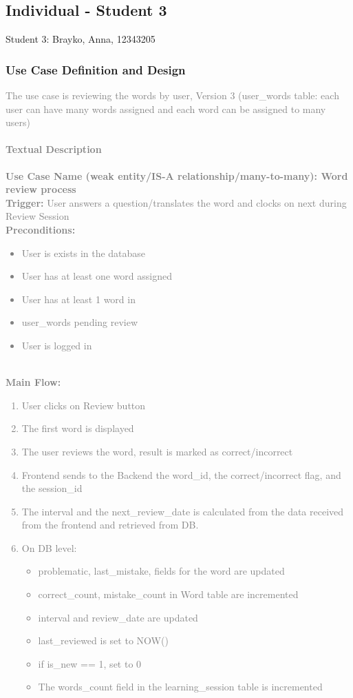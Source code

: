 \documentclass[a4paper, 11pt]{article}
\newcommand{\studentthree}{Student 3: Brayko, Anna, 12343205}
\begin{document}
\newpage

\subsection{Individual - Student 3}
\studentthree
\subsubsection{Use Case Definition and Design}
\textcolor{gray}{

The use case is reviewing the words by user, Version 3 (user\_words table: each user can have many words assigned and each word can be assigned to many users)


\paragraph*{Textual Description}
\textbf{Use Case Name (weak entity/IS-A relationship/many-to-many): Word review process}
\\
\textbf{Trigger:}    User answers a question/translates the word and clocks on next during Review Session                                       
\\
\textbf{Preconditions:}    
\begin{itemize}
    \item User is exists in the database
\item User has at least one word assigned
\item User has at least 1 word in \item user\_words pending review
\item User is logged in

\end{itemize}

\\
\textbf{Main Flow:} 
\begin{enumerate}
    \item 	User clicks on Review button
\item The first word is displayed
\item The user reviews the word, result is marked as correct/incorrect
\item 	Frontend sends to the Backend the word\_id, the correct/incorrect flag, and the session\_id
\item The interval and the next\_review\_date is calculated from the data received from the frontend and retrieved from DB.
\item On DB level:
\begin{itemize}
\item problematic, last\_mistake, fields for the word are updated
\item correct\_count, mistake\_count in Word table are incremented
\item	interval and review\_date are updated
\item	last\_reviewed is set to NOW()
\item	if is\_new  == 1, set to 0
\item	The words\_count field in the learning\_session table is incremented


\end{itemize}
\end{enumerate}}
\end{document}
